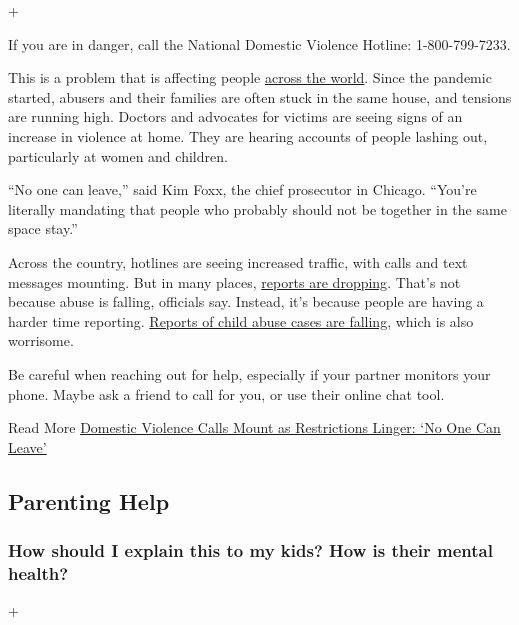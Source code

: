+

If you are in danger, call the National Domestic Violence Hotline:
1-800-799-7233.

This is a problem that is affecting people
\href{https://www.nytimes3xbfgragh.onion/2020/04/06/world/coronavirus-domestic-violence.html}{across
the world}. Since the pandemic started, abusers and their families are
often stuck in the same house, and tensions are running high. Doctors
and advocates for victims are seeing signs of an increase in violence at
home. They are hearing accounts of people lashing out, particularly at
women and children.

``No one can leave,'' said Kim Foxx, the chief prosecutor in Chicago.
``You're literally mandating that people who probably should not be
together in the same space stay.''

Across the country, hotlines are seeing increased traffic, with calls
and text messages mounting. But in many places,
\href{https://www.nytimes3xbfgragh.onion/2020/04/17/nyregion/new-york-city-domestic-violence-coronavirus.html}{reports
are dropping}. That's not because abuse is falling, officials say.
Instead, it's because people are having a harder time reporting.
\href{https://www.nytimes3xbfgragh.onion/2020/06/09/nyregion/coronavirus-nyc-child-abuse.html}{Reports
of child abuse cases are falling}, which is also worrisome.

Be careful when reaching out for help, especially if your partner
monitors your phone. Maybe ask a friend to call for you, or use their
online chat tool.

Read More
\href{https://www.nytimes3xbfgragh.onion/2020/05/15/us/domestic-violence-coronavirus.html}{Domestic
Violence Calls Mount as Restrictions Linger: `No One Can Leave'}

\hypertarget{parenting-help}{%
\subsection{Parenting Help}\label{parenting-help}}

\hypertarget{how-should-i-explain-this-to-my-kids-how-is-their-mental-health}{%
\subsubsection{How should I explain this to my kids? How is their mental
health?}\label{how-should-i-explain-this-to-my-kids-how-is-their-mental-health}}

+

